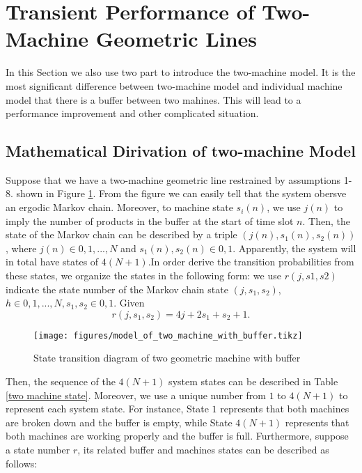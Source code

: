 
\section{Transient Performance of Two-Machine Geometric Lines}
\noindent In this Section we also use two part to introduce the two-machine model. It is the most significant difference between two-machine model and individual machine model that there is a buffer between two mahines. This will lead to a performance improvement and other complicated situation.

\subsection{Mathematical Dirivation of two-machine Model}
\label{mathematical two machine}
\noindent Suppose that we have a two-machine geometric line restrained by assumptions 1-8. shown in Figure \ref{State transition diagram of two geometric machine with buffer}. From the figure we can easily tell that the system obersve an ergodic Markov chain. Moreover, to machine state $s_i(n)$, we use $j(n)$ to imply the number of products in the buffer at the start of time slot $n$. Then, the state of the Markov chain can be described by a triple $(j(n),s_1(n),s_2(n))$, where $j(n)\in {0,1,...,N}$ and $s_1(n),s_2(n) \in {0,1}$. Apparently, the system will in total have states of $4(N+1)$.In order derive the transition probabilities from these states, we organize the states in the following form: we use $r(j,s1,s2)$ indicate the state number of the Markov chain state $(j,s_1,s_2)$, $h\in {0,1,...,N}, s_1,s_2\in {0,1}$. Given
\begin{equation}
	r(j,s_1,s_2) = 4j + 2s_1 +s_2 +1 .
	\label{definition of r}
\end{equation}
\begin{figure}[!h]
	\centering
	\texttt{[image: figures/model\_of\_two\_machine\_with\_buffer.tikz]}
	\caption{State transition diagram of two geometric machine with buffer}
	\label{State transition diagram of two geometric machine with buffer}
\end{figure}
Then, the sequence of the $4(N+1)$ system states can be described in Table \ref{two machine state}. Moreover, we use a unique number from $1$ to $4(N+1)$ to represent each system state. For instance, State $1$ represents that both machines are broken down and the buffer is empty, while State $4(N+1)$ represents that both machines are working properly and the buffer is full. Furthermore, suppose a state number $r$, its related buffer and machines states can be described as follows:
